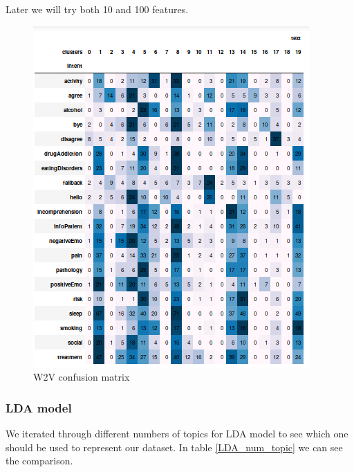 \documentclass[11pt]{article}
\begin{document}
Later we will try both 10 and 100 features.

\begin{figure}[h]
	\centering
 	\includegraphics[scale=0.7]{best_w2v_cm.png}
	\caption{W2V confusion matrix}
 \label{w2v_cm_mat}
 \end{figure}
\FloatBarrier

\subsubsection{LDA model}

We iterated through different numbers of topics for LDA model to see which one should be used to represent our dataset. In table \ref{LDA_num_topic} we can see the comparison. 
\end{document}

